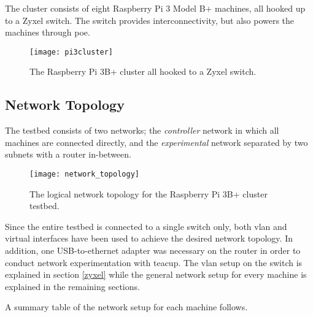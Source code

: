 The cluster consists of eight Raspberry Pi 3 Model B+ machines, all hooked up to a Zyxel switch. The switch provides interconnectivity, but also powers the machines through \gls{poe}.

\begin{figure}[H]
    \centering
    \texttt{[image: pi3cluster]}
    \captionsetup{width=0.6\linewidth}
    \caption{The Raspberry Pi 3B+ cluster all hooked to a Zyxel switch.}
    \label{fig:pi3cluster}
\end{figure}




\subsection{Network Topology} \label{network_topology}

The testbed consists of two networks; the \textit{controller} network in which all machines are connected directly, and the \textit{experimental} network separated by two subnets with a router in-between.

\begin{figure}[H]
    \centering
    \texttt{[image: network\_topology]}
    \captionsetup{width=0.8\linewidth}
    \caption{The logical network topology for the Raspberry Pi 3B+ cluster testbed.}
    \label{fig:network_topology}
\end{figure}

Since the entire testbed is connected to a single switch only, both \gls{vlan} and virtual interfaces have been used to achieve the desired network topology. In addition, one USB-to-ethernet adapter was necessary on the router in order to conduct network experimentation with \gls{teacup}. The \gls{vlan} setup on the switch is explained in section \ref{zyxel} while the general network setup for every machine is explained in the remaining sections.

A summary table of the network setup for each machine follows.

